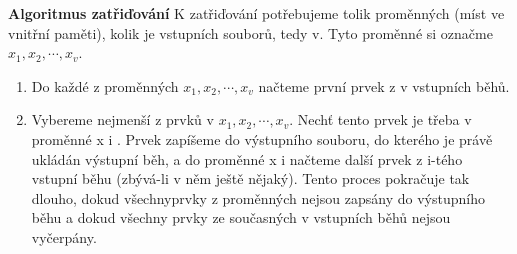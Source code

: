 \documentclass[10pt,a4paper]{article}
\begin{document}
\textbf{Algoritmus zatřiďování}
K zatřiďování potřebujeme tolik proměnných (míst ve vnitřní paměti), kolik je vstupních souborů, tedy v. Tyto proměnné si označme $x_1, x_2, \cdots, x_v$.
\begin{enumerate}
	\item Do každé z proměnných $x_1, x_2, \cdots, x_v$ načteme první prvek z v vstupních běhů.
	\item Vybereme nejmenší z prvků v $x_1, x_2, \cdots, x_v$. Nechť tento prvek je třeba v proměnné x i . Prvek zapíšeme do výstupního souboru, do kterého je právě ukládán výstupní běh, a do proměnné x i načteme další prvek z i-tého vstupní běhu (zbývá-li v něm ještě nějaký). Tento proces pokračuje tak dlouho, dokud všechnyprvky z proměnných nejsou zapsány do výstupního běhu a dokud všechny prvky ze současných v vstupních běhů nejsou vyčerpány.
\end{enumerate}
\end{document}
